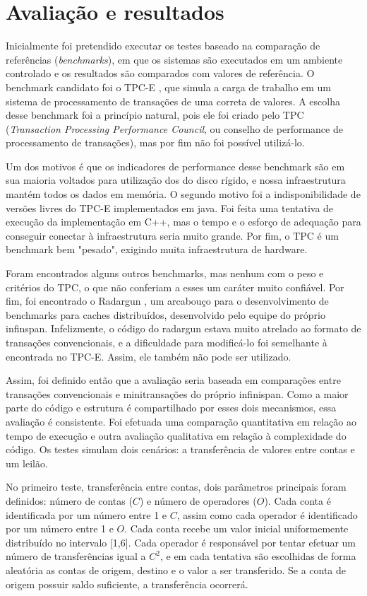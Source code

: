 \documentclass[11pt,twoside,a4paper]{book}
\begin{document}
\section{Avaliação e resultados}
\label{cap:resultados}

Inicialmente foi pretendido executar os testes baseado na comparação de referências (\emph{benchmarks}), em que os sistemas são executados em um ambiente controlado e os resultados são comparados com valores de referência. O benchmark candidato foi o TPC-E \cite{tpce}, que simula a carga de trabalho em um sistema de processamento de transações de uma correta de valores. A escolha desse benchmark foi a princípio natural, pois ele foi criado pelo TPC (\emph{Transaction Processing Performance Council}, ou conselho de performance de processamento de transações), mas por fim não foi possível utilizá-lo. 

Um dos motivos é que os indicadores de performance desse benchmark são em sua maioria voltados para utilização dos do disco rígido, e nossa infraestrutura mantém todos os dados em memória. O segundo motivo foi a indisponibilidade de versões livres do TPC-E implementados em java. Foi feita uma tentativa de execução da implementação em C++, mas o tempo e o esforço de adequação para conseguir conectar à infraestrutura seria muito grande. Por fim, o TPC é um benchmark bem "pesado", exigindo muita infraestrutura de hardware.

Foram encontrados alguns outros benchmarks, mas nenhum com o peso e critérios do TPC, o que não conferiam a esses um caráter muito confiável. Por fim, foi encontrado o Radargun \cite{radargun}, um arcabouço para o desenvolvimento de benchmarks para caches distribuídos, desenvolvido pelo equipe do próprio infinspan. Infelizmente, o código do radargun estava muito atrelado ao formato de transações convencionais, e a dificuldade para modificá-lo foi semelhante à encontrada no TPC-E. Assim, ele também não pode ser utilizado.

Assim, foi definido então que a avaliação seria baseada em comparações entre transações convencionais e minitransações do próprio infinispan. Como a maior parte do código e estrutura é compartilhado por esses dois mecanismos, essa avaliação é consistente. Foi efetuada uma comparação quantitativa em relação ao tempo de execução e outra avaliação qualitativa em relação à complexidade do código. Os testes simulam dois cenários: a transferência de valores entre contas e um leilão.

No primeiro teste, transferência entre contas, dois parâmetros principais foram definidos: número de contas ($C$) e número de operadores ($O$). Cada conta é identificada por um número entre 1 e $C$, assim como cada operador é identificado por um número entre 1 e $O$. Cada conta recebe um valor inicial uniformemente distribuído no intervalo [1,6]. Cada operador é responsável por tentar efetuar um número de transferências igual a $C^2$, e em cada tentativa são escolhidas de forma aleatória as contas de origem, destino e o valor a ser transferido. Se a conta de origem possuir saldo suficiente, a transferência ocorrerá.
\end{document}
